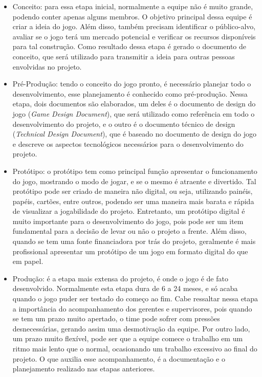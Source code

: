 \documentclass[quali]{ppgccufscar}
\begin{document}
\begin{itemize}
	\item Conceito: para essa etapa inicial, normalmente a equipe não é muito grande, podendo conter apenas alguns membros. O objetivo principal dessa equipe é criar a ideia do jogo. Além disso, também precisam identificar o público-alvo, avaliar se o jogo terá um mercado potencial e verificar os recursos disponíveis para tal construção. Como resultado dessa etapa é gerado o documento de conceito, que será utilizado para transmitir a ideia para outras pessoas envolvidas no projeto.
	\item Pré-Produção: tendo o conceito do jogo pronto, é necessário planejar todo o desenvolvimento, esse planejamento é conhecido como pré-produção. Nessa etapa, dois documentos são elaborados, um deles é o documento de design do jogo (\textit{Game Design Document}), que será utilizado como referência em todo o desenvolvimento do projeto, e o outro é o documento técnico de design (\textit{Technical Design Document}), que é baseado no documento de design do jogo e descreve os aspectos tecnológicos necessários para o desenvolvimento do projeto.
	\item Protótipo: o protótipo tem como principal função apresentar o funcionamento do jogo, mostrando o modo de jogar, e se o mesmo é atraente e divertido. Tal protótipo pode ser criado de maneira não digital, ou seja, utilizando painéis, papéis, cartões, entre outros, podendo ser uma maneira mais barata e rápida de visualizar a jogabilidade do projeto. Entretanto, um protótipo digital é muito importante para o desenvolvimento do jogo, pois pode ser um item fundamental para a decisão de levar ou não o projeto a frente. Além disso, quando se tem uma fonte financiadora por trás do projeto, geralmente é mais profissional apresentar um protótipo de um jogo em formato digital do que em papel.
	\item Produção: é a etapa mais extensa do projeto, é onde o jogo é de fato desenvolvido. Normalmente esta etapa dura de 6 a 24 meses, e só acaba quando o jogo puder ser testado do começo ao fim. Cabe ressaltar nessa etapa a importância do acompanhamento dos gerentes e supervisores, pois quando se tem um prazo muito apertado, o time pode sofrer com pressões desnecessárias, gerando assim uma desmotivação da equipe. Por outro lado, um prazo muito flexível, pode ser que a equipe comece o trabalho em um ritmo mais lento que o normal, ocasionando um trabalho excessivo ao final do projeto. O que auxilia esse acompanhamento, é a documentação e o planejamento realizado nas etapas anteriores.

\end{itemize}
\end{document}
